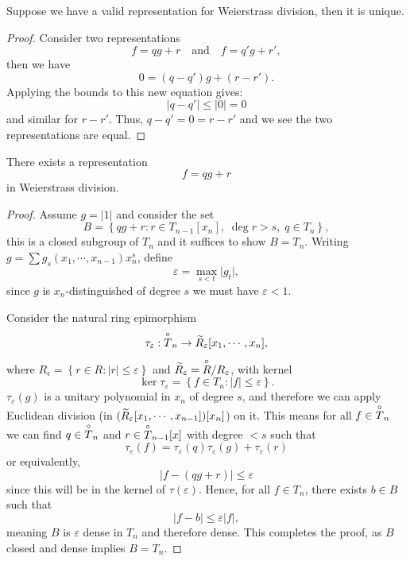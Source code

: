 \begin{lemma}\label{WD_uniqueness}
  Suppose we have a valid representation for Weierstrass division, then it is unique.
\end{lemma}

\begin{proof}
  Consider two representations
  \[
    f = q g + r \quad \text{and} \quad f = q' g + r',
  \]
  then we have
  \[
    0 = (q - q') g + (r - r').
  \]
  Applying the bounds to this new equation gives:
  \[
    \lvert q - q' \rvert \leq \lvert 0 \rvert = 0
  \]
  and similar for $r - r'$. Thus, $q - q' = 0 = r - r'$ and we see the two representations are equal.
\end{proof}


\begin{lemma}\label{WD_existence}
  There exists a representation
  \[
    f = q g + r
  \]
  in Weierstrass division.
\end{lemma}



\begin{proof}
  Assume $g = \lvert 1 \rvert$ and consider the set
  \[
    B = \left\{ qg + r : r \in T_{n-1}[x_n], \; \deg r > s, \; q \in T_n \right\},
  \]
  this is a closed subgroup of $T_n$ and it suffices to show $B = T_n$.
  Writing $g = \sum g_s (x_1, \cdots, x_{n-1}) x_n^s$, define
  \[
    \varepsilon = \max_{s < t} \lvert g_t \rvert,
  \]
  since $g$ is $x_n$-distinguished of degree $s$ we must have $\varepsilon < 1$.

  Consider the natural ring epimorphism
  \[
    \tau_\varepsilon : \overset{\circ}{T}_n \to \widetilde{R}_\varepsilon [x_1, \cdots, x_n],
  \]
  where $R_\epsilon = \left\{ r \in R : \lvert r \rvert \leq \varepsilon \right\}$ and $\widetilde{R}_\varepsilon
  = \overset{\circ}{R} / R_\varepsilon$, with kernel
  \[
    \ker \tau_\varepsilon = \left\{ f \in T_n : \lvert f \rvert \leq \varepsilon \right\}.
  \]
  $\tau_\varepsilon (g)$ is a unitary polynomial in $x_n$ of degree $s$, and therefore we can apply
  Euclidean division (in $(\widetilde{R}_\varepsilon [x_1, \cdots, x_{n-1}]) [x_n]$) on it.
  This means for all $f \in \overset{\circ}{T}_n$ we can find $q \in \overset{\circ}{T}_n$ and $r \in \overset{\circ}{T}_{n-1}[x]$ with
  degree $ < s$ such that
  \[
    \tau_\varepsilon (f) = \tau_\varepsilon (q) \tau_\varepsilon (g) + \tau_\varepsilon (r)
  \]
  or equivalently,
  \[
    \lvert f - (qg + r) \rvert \leq \varepsilon
  \]
  since this will be in the kernel of $\tau (\varepsilon)$.
  Hence, for all $f \in T_n$, there exists $b \in B$ such that
  \[
    \lvert f - b \rvert \leq \varepsilon \lvert f \rvert,
  \]
  meaning $B$ is $\varepsilon$ dense in $T_n$ and therefore dense.
  This completes the proof, as $B$ closed and dense implies $B = T_n$.
\end{proof}

